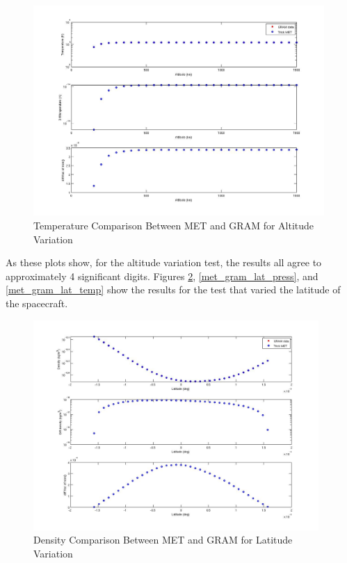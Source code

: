 \begin{description}
\begin{figure}[H]
\begin{center}
\includegraphics[height=80mm]{pics/MET_GRA_T01_temperature.jpg}
\caption{Temperature Comparison Between MET and GRAM for Altitude Variation}
\label{met_gram_alt_temp}
\end{center}
\end{figure}

As these plots show, for the altitude variation test, the results all agree to
approximately 4 significant digits.  Figures \ref{met_gram_lat_dens},
\ref{met_gram_lat_press}, and \ref{met_gram_lat_temp} show the results for the
test that varied the latitude of the spacecraft.

\begin{figure}[H]
\begin{center}
\includegraphics[height=80mm]{pics/MET_GRA_T02_density.jpg}
\caption{Density Comparison Between MET and GRAM for Latitude Variation}
\label{met_gram_lat_dens}
\end{center}
\end{figure}


\end{description}
